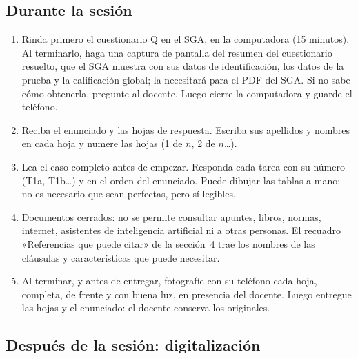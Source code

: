 \documentclass[11pt]{article}
\newcommand{\subseccion}[1]{\subsection{\textcolor{midblue}{#1}}}
\begin{document}
	\subseccion{Durante la sesión}
	
	\begin{enumerate}[leftmargin=18pt,itemsep=2pt]
		\item Rinda primero el cuestionario Q en el SGA, en la computadora (15 minutos). Al terminarlo, haga una captura de pantalla del resumen del cuestionario resuelto, que el SGA muestra con sus datos de identificación, los datos de la prueba y la calificación global; la necesitará para el PDF del SGA. Si no sabe cómo obtenerla, pregunte al docente. Luego cierre la computadora y guarde el teléfono.
		\item Reciba el enunciado y las hojas de respuesta. Escriba sus apellidos y nombres en cada hoja y numere las hojas (1 de $n$, 2 de $n$\ldots).
		\item Lea el caso completo antes de empezar. Responda cada tarea con su número (T1a, T1b\ldots) y en el orden del enunciado. Puede dibujar las tablas a mano; no es necesario que sean perfectas, pero sí legibles.
		\item Documentos cerrados: no se permite consultar apuntes, libros, normas, internet, asistentes de inteligencia artificial ni a otras personas. El recuadro «Referencias que puede citar» de la sección~4 trae los nombres de las cláusulas y características que puede necesitar.
		\item Al terminar, y antes de entregar, fotografíe con su teléfono cada hoja, completa, de frente y con buena luz, en presencia del docente. Luego entregue las hojas y el enunciado: el docente conserva los originales.
	\end{enumerate}
	
	\subseccion{Después de la sesión: digitalización}
	
\end{document}
